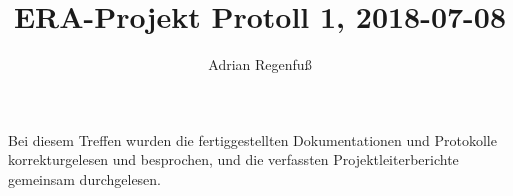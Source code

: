 \documentclass{article}
\title{ERA-Projekt Protoll 1, 2018-07-08}
\author{Adrian Regenfuß}
\begin{document}
\maketitle

Bei diesem Treffen wurden die fertiggestellten Dokumentationen und Protokolle
korrekturgelesen und besprochen, und die verfassten Projektleiterberichte
gemeinsam durchgelesen.
\end{document}
